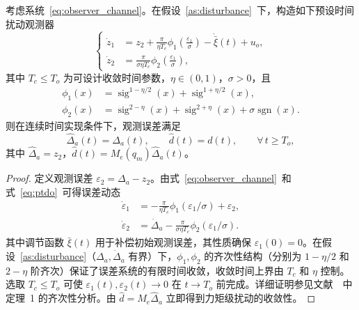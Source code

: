 \begin{theorem}[预设时间扰动观测器]\label{thm:ptdo}
  考虑系统~\eqref{eq:observer_channel}。在假设~\ref{as:disturbance}~下，构造如下预设时间扰动观测器
  \begin{equation}
  \left\{
  \begin{aligned}
  \dot z_1 &= z_2 + \frac{\pi}{\eta T_c}
             \phi_1\!\left(\frac{\varepsilon_1}{\sigma}\right)
             - \dot{\bar\xi}(t) + u_o, \\[4pt]
  \dot z_2 &= \frac{\pi}{\sigma\eta T_c}
             \phi_2\!\left(\frac{\varepsilon_1}{\sigma}\right),
  \end{aligned}
  \right.
  \label{eq:ptdo}
  \end{equation}
  其中 \(T_c\le T_o\) 为可设计收敛时间参数，\(\eta\in(0,1)\)，\(\sigma>0\)，且
  \begin{align}
  \phi_1(x) &= \operatorname{sig}^{1-\eta/2}(x) + \operatorname{sig}^{1+\eta/2}(x), \label{eq:phi1}\\
  \phi_2(x) &= \operatorname{sig}^{2-\eta}(x) + \operatorname{sig}^{2+\eta}(x) + \sigma\operatorname{sgn}(x). \label{eq:phi2}
  \end{align}
  则在连续时间实现条件下，观测误差满足
  \begin{equation}
  \hat\Delta_a(t) = \Delta_a(t),\qquad
  \hat d(t) = d(t),\qquad \forall\,t\ge T_o,
  \label{eq:observer_convergence}
  \end{equation}
  其中 \(\hat\Delta_a = z_2\)，\(\hat d(t) = M_e(q_m)\hat\Delta_a(t)\)。
\end{theorem}

\begin{proof}
  定义观测误差 \(\varepsilon_2 = \Delta_a - z_2\)。由式~\eqref{eq:observer_channel}~和式~\eqref{eq:ptdo}~可得误差动态
  \begin{align*}
  \dot\varepsilon_1 &= -\frac{\pi}{\eta T_c}\phi_1(\varepsilon_1/\sigma) + \varepsilon_2,\\
  \dot\varepsilon_2 &= \dot\Delta_a - \frac{\pi}{\sigma\eta T_c}\phi_2(\varepsilon_1/\sigma).
  \end{align*}
  其中调节函数 \(\bar\xi(t)\) 用于补偿初始观测误差，其性质确保 \(\varepsilon_1(0)=0\)。在假设~\ref{as:disturbance}（\(\Delta_a,\dot\Delta_a\) 有界）下，\(\phi_1,\phi_2\) 的齐次性结构（分别为 \(1-\eta/2\) 和 \(2-\eta\) 阶齐次）保证了误差系统的有限时间收敛，收敛时间上界由 \(T_c\) 和 \(\eta\) 控制。选取 \(T_c\le T_o\) 可使 \(\varepsilon_1(t),\varepsilon_2(t)\to0\) 在 \(t\to T_o\) 前完成。详细证明参见文献~\cite{jiangPrescribedtimeDisturbanceObserver2024}~中定理~1 的齐次性分析。由 \(\hat d = M_e\hat\Delta_a\) 立即得到力矩级扰动的收敛性。
\end{proof}

